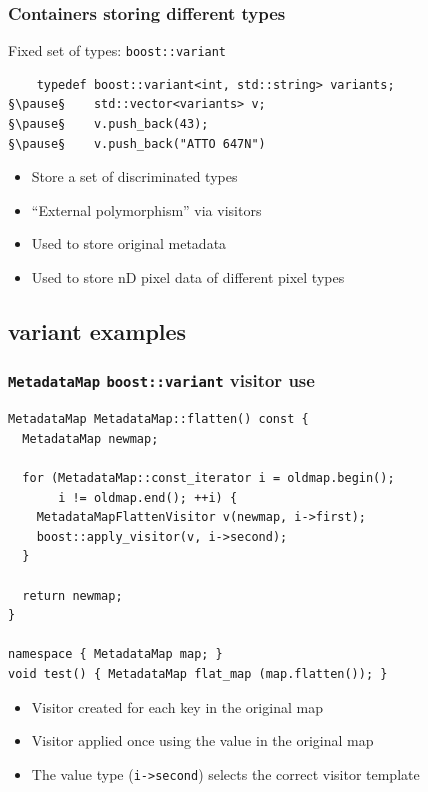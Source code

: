 \documentclass[handout]{beamer}
\begin{document}
\begin{frame}[fragile]
  \frametitle{Containers storing different types}
\begin{block}{Fixed set of types: \texttt{boost::variant}}
  \begin{lstlisting}
    typedef boost::variant<int, std::string> variants;
§\pause§    std::vector<variants> v;
§\pause§    v.push_back(43);
§\pause§    v.push_back("ATTO 647N")
\end{lstlisting}
  \begin{itemize}
    \pause
  \item Store a set of discriminated types
    \pause
  \item “External polymorphism” via visitors
    \pause
  \item Used to store original metadata
  \item Used to store nD pixel data of different pixel types
  \end{itemize}
\end{block}
\end{frame}

\subsection{variant examples}

\begin{frame}[fragile]
  \frametitle{\texttt{MetadataMap} \texttt{boost::variant} visitor use}
    \scriptsize
    \begin{lstlisting}
MetadataMap MetadataMap::flatten() const {
  MetadataMap newmap;

  for (MetadataMap::const_iterator i = oldmap.begin();
       i != oldmap.end(); ++i) {
    MetadataMapFlattenVisitor v(newmap, i->first);
    boost::apply_visitor(v, i->second);
  }

  return newmap;
}

namespace { MetadataMap map; }
void test() { MetadataMap flat_map (map.flatten()); }
\end{lstlisting}
  \begin{itemize}
    \pause
  \item Visitor created for each key in the original map
  \item Visitor applied once using the value in the original map
  \item The value type (\texttt{i->second}) selects the correct visitor template
  \end{itemize}
\end{frame}
\end{document}
